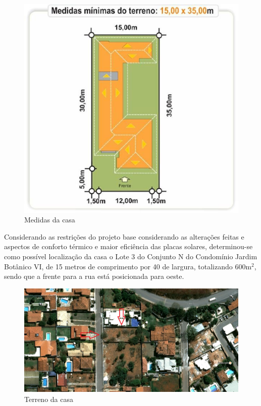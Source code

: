 \begin{figure}[H]
  \begin{center}
	\includegraphics[keepaspectratio,scale=0.7,angle=0]{figuras/medidas.eps}
	\caption{Medidas da casa}
  \end{center}
\end{figure}

	Considerando as restrições do projeto base considerando as alterações feitas e aspectos de conforto térmico e maior eficiência das placas solares, determinou-se como possível localização da casa o Lote 3 do Conjunto N do Condomínio Jardim Botânico VI, de 15 metros de comprimento por 40 de largura, totalizando $600\si{\meter}^{2}$, sendo que a frente para a rua está posicionada para oeste.

\newpage

\begin{figure}[H]
  \begin{center}
	\includegraphics[keepaspectratio,scale=0.3,angle=0]{figuras/terreno.eps}
	\caption{Terreno da casa}
  \end{center}
\end{figure}


